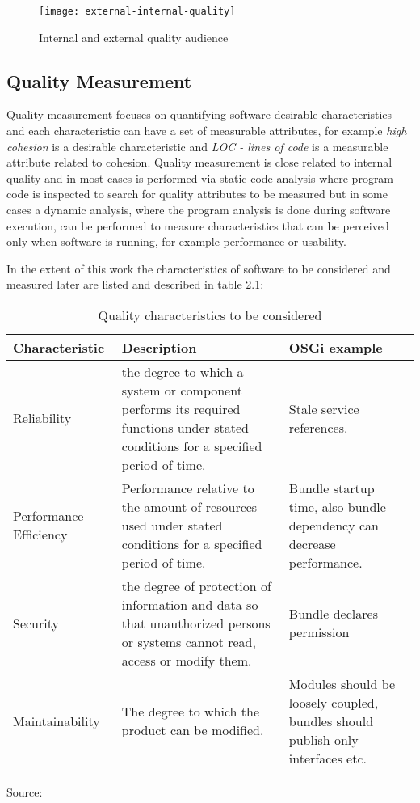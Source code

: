 \begin{figure}[h]
\caption{Internal and external quality audience}
\centering
\texttt{[image: external-internal-quality]}
\end{figure}


\subsection{Quality Measurement}
Quality measurement focuses on quantifying software desirable characteristics and each characteristic can have a set of measurable attributes, for example \textit{high cohesion} is a desirable characteristic and \textit{LOC - lines of code} is a measurable attribute related to cohesion. Quality measurement is close related to internal quality and in most cases is performed via static code analysis where program code is inspected to search for quality attributes to be measured but in some cases a dynamic analysis, where the program analysis is done during software execution, can be performed to measure characteristics that can be perceived only when software is running, for example performance or usability.     

In the extent of this work the characteristics of software to be considered and measured later are listed and described in table 2.1:  

\begin{table}[h]
\caption{Quality characteristics to be considered}
\begin{center}
    \begin{tabular}{  p{3cm} | p{8cm} | p{5cm} }
    \hline
    Characteristic & Description & OSGi example \\  \hline
    Reliability & the degree to which a system or component performs its required functions under stated conditions for a specified period of time. & Stale service references.\\ \hline
    Performance Efficiency & Performance relative to the amount of resources used under stated conditions for a specified
period of time. & Bundle startup time, also bundle dependency can decrease performance. \\ \hline
    Security & the degree of protection of information and data so that unauthorized persons or systems cannot read, access or modify them. & Bundle declares permission \\ \hline
    Maintainability & The degree to which the product can be modified. & Modules should be loosely coupled, bundles should publish only interfaces etc. \\ 
    \hline
     
    \end{tabular}
    Source: \cite{cisq 2012}
\end{center}
\end{table}
\FloatBarrier

